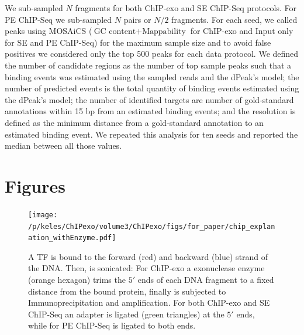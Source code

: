 \documentclass{bmcart}\usepackage[]{graphicx}\usepackage[]{color}
\begin{document}
We sub-sampled $N$ fragments for both ChIP-exo and SE ChIP-Seq
protocols. For PE ChIP-Seq we sub-sampled $N$ pairs or $N/2$
fragments. For each seed, we called peaks using MOSAiCS \cite{mosaics}
($\mbox{GC content} + \mbox{Mappability}$ for ChIP-exo and
$\mbox{Input only}$ for SE and PE ChIP-Seq) for the maximum sample
size and to avoid false positives we considered only the top 500 peaks
for each data protocol. We defined the number of candidate regions as
the number of top sample peaks such that a binding events was
estimated using the sampled reads and the dPeak's model; the number of
predicted events is the total quantity of binding events estimated
using the dPeak's model; the number of identified targets are number
of gold-standard annotations within 15 bp from an estimated
binding events; and the resolution is defined as the minimum distance
from a gold-standard annotation to an estimated binding event. We
repeated this analysis for ten seeds and reported the median between
all those values.



\nocite{exo_gb}
\nocite{maplot1}
\nocite{maplot2}
\nocite{chipbeyond}



\newpage

\section{Figures}

\begin{figure}[h!]
  \centering
  \texttt{[image: /p/keles/ChIPexo/volume3/ChIPexo/figs/for\_paper/chip\_explanation\_withEnzyme.pdf]}
  \caption{A TF is bound to the forward (red) and backward (blue)
    strand of the DNA. Then, is sonicated: For ChIP-exo a exonuclease
    enzyme (orange hexagon) trims the $5\prime$ ends of each DNA
    fragment to a fixed distance from the bound protein, finally is
    subjected to Immunoprecipitation and amplification. For both
    ChIP-exo and SE ChIP-Seq an adapter is ligated (green triangles)
    at the $5\prime$ ends, while for PE ChIP-Seq is ligated to both
    ends.}
  \label{fig:chip_diagram}
\end{figure}
\newpage
\end{document}
